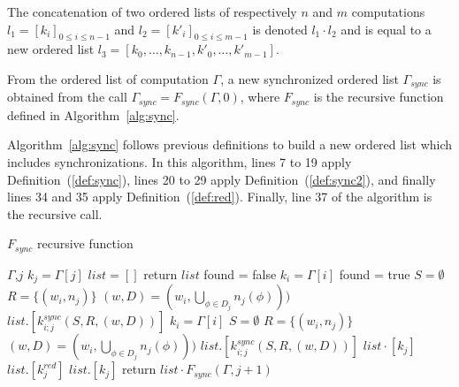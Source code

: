 \begin{mydef}
The concatenation of two ordered lists of respectively $n$ and $m$ computations $l_1=[k_i]_{0 \leq i \leq n-1}$ and $l_2=[k'_i]_{0 \leq i \leq m-1}$ is denoted $l_1 \cdot l_2$ and is equal to a new ordered list $l_3=[k_0,\dots,k_{n-1},k'_0,\dots,k'_{m-1}]$.
\end{mydef}

\begin{mydef}
From the ordered list of computation $\Gamma$, a new synchronized ordered list $\Gamma_{sync}$ is obtained from the call $\Gamma_{sync} = F_{sync}(\Gamma,0)$, where $F_{sync}$ is the recursive function defined in Algorithm~\ref{alg:sync}.
\end{mydef}

Algorithm~\ref{alg:sync} follows previous definitions to build a new ordered list which includes synchronizations. In this algorithm, lines 7 to 19 apply Definition~(\ref{def:sync}), lines 20 to 29 apply Definition~(\ref{def:sync2}), and finally lines 34 and 35 apply Definition~(\ref{def:red}). Finally, line 37 of the algorithm is the recursive call.

\begin{algorithm}
\caption{$F_{sync}$ recursive function}
\label{alg:sync}
\begin{algorithmic}[1]
 {$\Gamma$,$j$}
\State $k_j = \Gamma[j]$
\State $list = []$
\State return $list$
\State found = false
\State $k_i = \Gamma[i]$
\State found = true
\State $S = \emptyset$
\State $R = \{(w_i,n_j)\}$
\State $(w,D) = (w_i,\bigcup_{\phi \in D_j} n_j(\phi)))$
\State $list.[k_{i;j}^{sync}(S,R,(w,D))]$%
\EndIf
\EndFor
{}
\State $k_i = \Gamma[i]$
\State $S = \emptyset$
\State $R = \{(w_i,n_j)\}$
\State $(w,D) = (w_i,\bigcup_{\phi \in D_j} n_j(\phi)))$
\State $list.[k_{i;j}^{sync}(S,R,(w,D))]$%
\EndIf
\EndFor
\EndIf
\State $list \cdot [k_j]$
\EndFor
{}
\State $list.[k^{red}_j]$
\Else
\State $list.[k_j]$
\EndIf
\State return $list \cdot F_{sync}(\Gamma,j+1)$
\EndProcedure
\end{algorithmic}
\end{algorithm}


